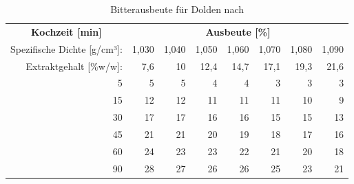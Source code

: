 \documentclass[a4paper,parskip=half]{scrartcl}
\begin{document}
\begin{table}[H]
\centering
\begin{tabular}{rrrrrrrr} 
\toprule
\multicolumn{1}{c}{\textbf{Kochzeit [min]}} & \multicolumn{7}{c}{\textbf{Ausbeute [\%]}}  \\
Spezifische Dichte [g/cm³]:                                        & 1,030 & 1,040 & 1,050 & 1,060 & 1,070 & 1,080  & 1,090                   \\
Extraktgehalt [\%w/w]:                                            & 7,6 & 10 & 12,4 & 14,7 & 17,1 & 19,3  & 21,6                   \\                                            
\midrule

5                                            & 5     & 5     & 4     & 4     & 3     & 3      & 3                          \\
15                                           & 12    & 12    & 11    & 11    & 11    & 10     & 9                          \\
30                                           & 17    & 17    & 16    & 16    & 15    & 15     & 13                         \\
45                                           & 21    & 21    & 20    & 19    & 18    & 17     & 16                         \\
60                                           & 24    & 23    & 23    & 22    & 21    & 20     & 18                         \\
90                                           & 28    & 27    & 26    & 26    & 25    & 23     & 21                         \\
\bottomrule
\end{tabular}
\caption{Bitterausbeute für Dolden nach \citeauthor{Mosher1994} \parencite[51]{Holle2010}}
\label{table:mosherutil}
\end{table}
\end{document}

